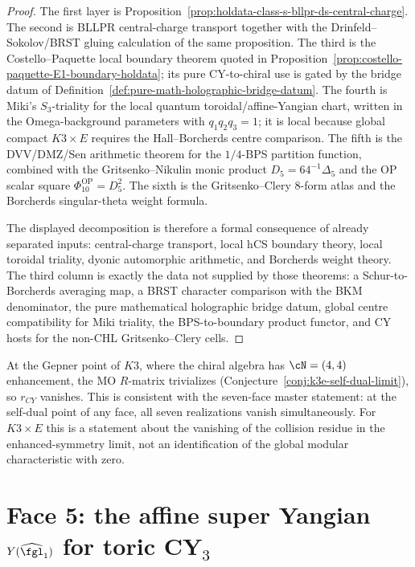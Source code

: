 \begin{proof}
The first layer is Proposition~\ref{prop:holdata-class-s-bllpr-ds-central-charge}.
The second is BLLPR central-charge transport together with the
Drinfeld--Sokolov/BRST gluing calculation of the same proposition.
The third is the Costello--Paquette local boundary theorem quoted in
Proposition~\ref{prop:costello-paquette-E1-boundary-holdata}; its pure
CY-to-chiral use is gated by the bridge datum of
Definition~\ref{def:pure-math-holographic-bridge-datum}. The fourth is
Miki's \(S_3\)-triality for the local quantum toroidal/affine-Yangian
chart, written in the Omega-background parameters with
\(q_1q_2q_3=1\); it is local because global compact \(K3\times E\)
requires the Hall--Borcherds centre comparison. The fifth is the
DVV/DMZ/Sen arithmetic theorem for the \(1/4\)-BPS partition function,
combined with the Gritsenko--Nikulin monic product
\(D_5=64^{-1}\Delta_5\) and the OP scalar square
\(\Phi_{10}^{\mathrm{OP}}=D_5^2\). The sixth is the Gritsenko--Clery
\(8\)-form atlas and the Borcherds singular-theta weight formula.

The displayed decomposition is therefore a formal consequence of
already separated inputs: central-charge transport, local hCS
boundary theory, local toroidal triality, dyonic automorphic
arithmetic, and Borcherds weight theory. The third column is exactly
the data not supplied by those theorems: a Schur-to-Borcherds averaging
map, a BRST character comparison with the BKM denominator, the pure
mathematical holographic bridge datum, global centre compatibility for
Miki triality, the BPS-to-boundary product functor, and CY hosts for the
non-CHL Gritsenko--Clery cells.
\end{proof}

\begin{remark}
\label{rem:gepner-trivialization}
At the Gepner point of $K3$, where the chiral algebra has $\cN = (4,4)$
enhancement, the MO $R$-matrix trivializes
(Conjecture~\ref{conj:k3e-self-dual-limit}), so $r_{CY}$ vanishes.
This is consistent with the seven-face master statement: at the self-dual
point of any face, all seven realizations vanish simultaneously. For
$K3 \times E$ this is a statement about the vanishing of the collision
residue in the enhanced-symmetry limit, not an identification of the
global modular characteristic with zero.
\end{remark}


\section{Face 5: the affine super Yangian \texorpdfstring{$Y(\widehat{\fgl}_1)$}{Y(widehatfgl-1)} for toric CY\texorpdfstring{$_3$}{-3}}
\label{sec:face5-yangian}

